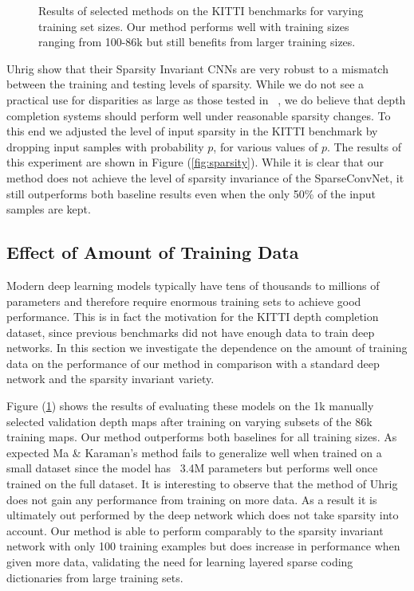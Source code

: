 \begin{figure}
\begin{minipage}{0.45\textwidth}
    \caption{Results of selected methods on the KITTI benchmarks for varying training set sizes. Our method performs well with training sizes ranging from 100-86k but still benefits from larger training sizes.}
    \label{fig:trainsize}
  \end{minipage}
\end{figure}

Uhrig \etal show that their Sparsity Invariant CNNs are very robust to a mismatch between the training and testing levels of sparsity. While we do not see a practical use for disparities as large as those tested in ~\cite{uhrig}, we do believe that depth completion systems should perform well under reasonable sparsity changes. To this end we adjusted the level of input sparsity in the KITTI benchmark by dropping input samples with probability $p$, for various values of $p$. The results of this experiment are shown in Figure (\ref{fig:sparsity}). While it is clear that our method does not achieve the level of sparsity invariance of the SparseConvNet, it still outperforms both baseline results even when the only 50\% of the input samples are kept.
\subsection{Effect of Amount of Training Data}
\label{sec:effect-training-data}

Modern deep learning models typically have tens of thousands to millions of parameters and therefore require enormous training sets to achieve good performance. This is in fact the motivation for the KITTI depth completion dataset, since previous benchmarks did not have enough data to train deep networks. In this section we investigate the dependence on the amount of training data on the performance of our method in comparison with a standard deep network and the sparsity invariant variety.

Figure (\ref{fig:trainsize}) shows the results of evaluating these models on the 1k manually selected validation depth maps after training on varying subsets of the 86k training maps. Our method outperforms both baselines for all training sizes. As expected Ma \& Karaman's method fails to generalize well when trained on a small dataset since the model has ~3.4M parameters but performs well once trained on the full dataset. It is interesting to observe that the method of Uhrig \etal does not gain any performance from training on more data. As a result it is ultimately out performed by the deep network which does not take sparsity into account. Our method is able to perform comparably to the sparsity invariant network with only 100 training examples but does increase in performance when given more data, validating the need for learning layered sparse coding dictionaries from large training sets. 
